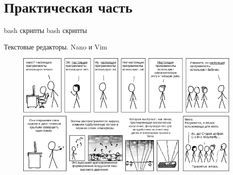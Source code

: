 \documentclass[10pt]{beamer}
\begin{document}


\section{Практическая часть}



\begin{frame}[c]{bash скрипты}
bash скрипты
\end{frame}

\begin{frame}[c]{Текстовые редакторы. Nano и Vim}
	\begin{figure}
		\centerline{\includegraphics[width=1.15\linewidth]{images/real_programmers.png}}
	\end{figure}
\end{frame}
\end{document}
